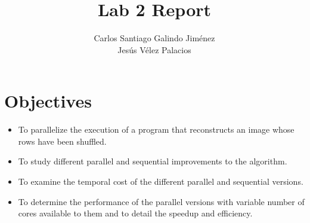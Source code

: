 \documentclass[a4paper]{article}
\title{Lab 2 Report}
\author{Carlos Santiago Galindo Jiménez\\ Jesús Vélez Palacios}
\begin{document}
\maketitle
\section{Objectives}
\begin{itemize}
    \item To parallelize the execution of a program that reconstructs an image whose rows have been shuffled.
    \item To study different parallel and sequential improvements to the algorithm.
    \item To examine the temporal cost of the different parallel and sequential versions.
    \item To determine the performance of the parallel versions with variable number of cores available to them and to detail the speedup and efficiency.
\end{itemize}
\end{document}
